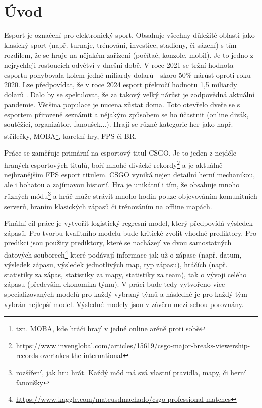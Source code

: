 \chapter{Úvod}
Esport je označení pro elektronický sport. Obsahuje všechny důležité oblasti jako klasický sport (např. turnaje, trénování, investice, stadiony, či sázení)
s tím rozdílem, že se hraje na nějakém zařízení (počítač, konzole, mobil).
Je to jedno z nejrychleji rostoucích odvětví v dnešní době. V roce 2021 se tržní hodnota esportu pohybovala kolem jedné miliardy dolarů - skoro
50\% nárůst oproti roku 2020. Lze předpovídat, že v roce 2024 esport překročí hodnotu 1,5 miliardy dolarů \cite{Gough2021}.
Dalo by se spekulovat, že za takový velký nárůst je zodpovědná aktuální pandemie. Většina populace je nucena zůstat doma. Toto otevřelo dveře
se s esportem přirozeně seznámit a nějakým způsobem se ho účastnit (online divák, soutěžící, organizátor, fanoušek...). 
Hrají se různé kategorie her jako např. střílečky, \ac{MOBA}\footnote{tzn. MOBA, kde hráči hrají v jedné online aréně proti sobě},
karetní hry, \ac{FPS} či \ac{BR}.

Práce se zaměřuje primární na esportový titul \acf{CSGO}. Je to jeden z nejdéle hraných esportových titulů, boří mnohé divácké
rekordy\footnote{\scriptsize \url{https://www.invenglobal.com/articles/15619/csgo-major-breaks-viewership-records-overtakes-the-international}}
a je aktuálně nejhranějším \ac{FPS} esport titulem. \ac{CSGO} vyniká nejen detailní herní mechanikou, ale i bohatou a zajímavou historií. Hra
je unikátní i tím, že obsahuje mnoho různých módu\footnote{rozšíření, jak hru hrát. Každý mód má svá vlastní pravidla, mapy, či herní fanoušky}
a hráč může strávit mnoho hodin pouze objevováním komunitních serverů, hraním klasických zápasů či trénováním na offline mapách.

Finální cíl práce je vytvořit logistický regresní model, který předpovídá výsledek zápasů. Pro tvorbu kvalitního modelu bude kritické zvolit vhodné prediktory.
{\color{red}
Pro predikci jsou použity prediktory, které se nacházejí ve dvou samostatných datových souborech\footnote{\url{https://www.kaggle.com/mateusdmachado/csgo-professional-matches}} 
}
které podávají informace jak už o zápase (např. datum, 
výsledek zápasu, výsledek jednotlivých map, typ zápasu), hráčích (např. statistiky za zápas, statistiky za mapy, statistiky za team), tak o 
vývoji celého zápasu (především ekonomika týmu). V práci bude tedy vytvořeno více specializovaných modelů pro každý vybraný týmů a následně
je pro každý tým vybrán nejlepší model. Výsledné modely jsou v závěru mezi sebou porovnány.

